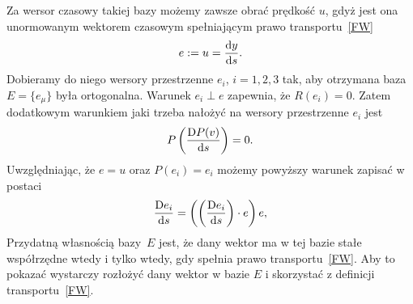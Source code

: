 Za wersor czasowy takiej bazy możemy zawsze obrać prędkość $u$, gdyż 
jest ona unormowanym wektorem czasowym spełniającym 
prawo transportu~\eqref{FW}
\begin{align*}
e := u = \frac{\text{d} y}{\text{d} s}.
\end{align*}
Dobieramy do niego wersory 
przestrzenne $e_i$, $i=1,2,3$ tak, aby otrzymana baza $E=\{ e_\mu \}$ była
 ortogonalna.  Warunek $e_i \perp e$ zapewnia, że $R(e_i)=0$. 
Zatem dodatkowym warunkiem jaki trzeba nałożyć na wersory
przestrzenne $e_i$ jest 
\begin{align*}
P \left(\frac{\text{D} P(v)}{\text{d} s} \right)  = 0.
\end{align*} 
Uwzględniając, że $e=u$ oraz $P(e_i)=e_i$ możemy powyższy warunek
zapisać w postaci
\begin{align}\label{FWwkw}
\frac{\text{D} e_i }{\text{d} s} = 
\left( \left(\frac{\text{D} e_i }{\text{d} s}\right) \cdot e\right) e, 
\end{align}
Przydatną własnością bazy~$E$ jest, że dany wektor 
ma w tej bazie stałe współrzędne wtedy i tylko wtedy, gdy
spełnia prawo transportu~\eqref{FW}.
Aby to pokazać wystarczy rozłożyć dany wektor w bazie 
$E$ i skorzystać z definicji transportu~\eqref{FW}.

